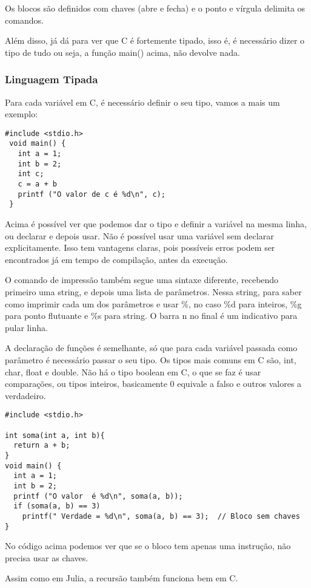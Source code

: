 \documentclass[a4paper]{article}
\begin{document}
Os blocos são definidos com chaves (abre e fecha) e o ponto e vírgula
delimita os comandos.

Além disso, já dá para ver que C é fortemente tipado, isso é, é necessário
dizer o tipo de tudo ou seja, a função main() acima, não devolve nada.

\subsubsection{Linguagem Tipada}
\label{sec:orgd15b077}

Para cada variável em C, é necessário definir o seu tipo, vamos a mais
um exemplo:

\begin{verbatim}
#include <stdio.h>
 void main() {
   int a = 1;
   int b = 2;
   int c;
   c = a + b
   printf ("O valor de c é %d\n", c);
 }
\end{verbatim}

Acima é possível ver que podemos dar o tipo e definir a variável na mesma linha, ou
declarar e depois usar. Não é possível usar uma variável sem declarar explicitamente.
Isso tem vantagens claras, pois possíveis erros podem ser encontrados já em tempo de
compilação, antes da execução.

O comando de impressão também segue uma sintaxe diferente, recebendo primeiro uma
string, e depois uma lista de parâmetros. Nessa string, para saber como imprimir cada um
dos parâmetros e usar \%, no caso \%d para inteiros, \%g para ponto flutuante e \%s para string.
O barra n  no final é um indicativo para pular linha.

A declaração de funções é semelhante, só que para cada variável passada como parâmetro é
necessário passar o seu tipo. Os tipos mais comuns em C são, int, char, float e double.
Não há o tipo boolean em C, o que se faz é usar comparações, ou tipos inteiros, basicamente
0 equivale a falso e outros valores a verdadeiro.

\begin{verbatim}
#include <stdio.h>

int soma(int a, int b){
  return a + b;
}
void main() {
  int a = 1;
  int b = 2;
  printf ("O valor  é %d\n", soma(a, b));
  if (soma(a, b) == 3)
    printf(" Verdade = %d\n", soma(a, b) == 3);  // Bloco sem chaves
}
\end{verbatim}

No código acima podemos ver que se o bloco tem apenas uma instrução,
não precisa usar as chaves.

Assim como em Julia, a recursão também funciona bem em C.
\end{document}

